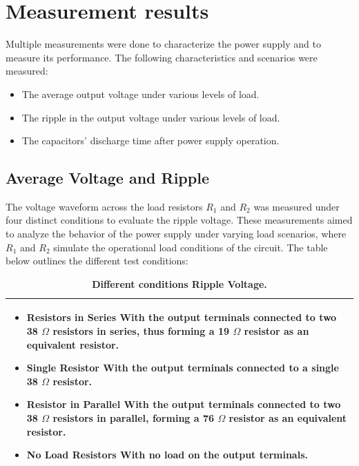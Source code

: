 \chapter{Measurement results } 

Multiple measurements were done to characterize the power supply and to measure its performance. The following characteristics and scenarios were measured:
\begin{itemize}
    \item The average output voltage under various levels of load.
    \item The ripple in the output voltage under various levels of load.
    \item The capacitors' discharge time after power supply operation. 
\end{itemize} 

\section{Average Voltage and Ripple}

The voltage waveform across the load resistors $R_{1}$ and $R_{2}$ was measured under four distinct conditions to evaluate the ripple voltage. These measurements aimed to analyze the behavior of the power supply under varying load scenarios, where $R_{\text{1}}$ and $R_{\text{2}}$ simulate the operational load conditions of the circuit. The table below outlines the different test conditions:

\begin{table}[h!]
\centering
\captionsetup{justification=centering, labelfont=bf}
\caption{\textbf{Different conditions Ripple Voltage.}}
\begin{tabular*}{0.9\textwidth}{@{\extracolsep{\fill}} p{} @{}} 
\toprule
    \begin{itemize}
        \item \textbf{Resistors in Series} \newline With the output terminals connected to two 38 $\Omega$ resistors in series, thus forming a 19 $\Omega$ resistor as an equivalent resistor.
        \item \textbf{Single Resistor} \newline With the output terminals connected to a single 38 $\Omega$ resistor.
        \item \textbf{Resistor in Parallel} \newline With the output terminals connected to two 38 $\Omega$ resistors in parallel, forming a 76 $\Omega$ resistor as an equivalent resistor.
        \item \textbf{No Load Resistors} \newline With no load on the output terminals.
    \end{itemize} \\
     \bottomrule
\end{tabular*}
\label{ConditionsRippleVoltage}
\end{table}

